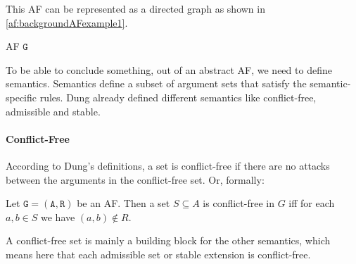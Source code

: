 This AF can be represented as a directed graph as shown in \cref{af:backgroundAFexample1}.
\begin{example}[h]
    \centering
    \caption{\ac{AF} $\mathtt{G}$}
    \label{af:backgroundAFexample1}
\end{example}

To be able to conclude something, out of an abstract AF, we need to define semantics. Semantics define a subset of argument sets that satisfy the semantic-specific rules. Dung already defined different semantics \cite{Dung1995-DUNOTA-2} like conflict-free, admissible and stable.

\newpage
\paragraph{Conflict-Free} According to Dung's definitions, a set is conflict-free if there are no attacks between the arguments in the conflict-free set. Or, formally:

\begin{definition}
    Let $\mathtt{G=(A,R)}$ be an AF. Then a set $S \subseteq A$ is conflict-free in $G$ iff for each $a, b \in S$ we have $(a, b) \not\in R$.
\end{definition}

A conflict-free set is mainly a building block for the other semantics, which means here that each admissible set or stable extension is conflict-free.

